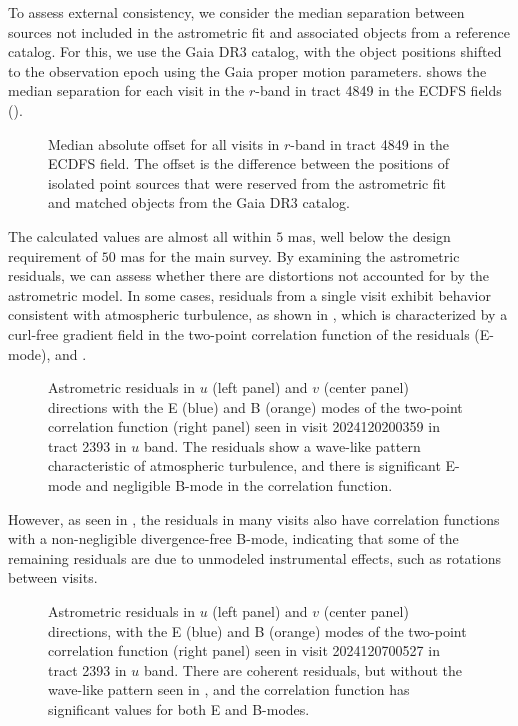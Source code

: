 To assess external consistency, we consider the median separation between sources not included in the astrometric fit and associated objects from a reference catalog.
For this, we use the Gaia \gls{DR3} catalog, with the object positions shifted to the observation epoch using the Gaia proper motion parameters.
 shows the median separation for each visit in the $r$-band in \gls{tract} 4849 in the ECDFS fields ().
\begin{figure}[htb!]
\caption{Median absolute offset for all visits in $r$-band in \gls{tract} 4849 in the ECDFS field. 
The offset is the difference between the positions of isolated point sources that were reserved from the astrometric fit and matched objects from the Gaia DR3 catalog.}
\label{fig:AA1}
\end{figure}
The calculated values are almost all within $5$\xspace mas, well below the design requirement of $50$\xspace mas for the main survey.
By examining the astrometric residuals, we can assess whether there are distortions not accounted for by the astrometric model. 
In some cases, residuals from a single visit exhibit behavior consistent with atmospheric turbulence, as shown in , which is characterized by a curl-free gradient field in the two-point correlation function of the residuals (E-mode),  \citet{Leget2021} and \citet{Fortino2021}. 
\begin{figure}[htb!]
\caption{Astrometric residuals in $u$ (left panel) and $v$ (center panel) directions with the E (blue) and B (orange) modes of the two-point correlation function (right panel) 
seen in visit 2024120200359 in tract 2393 in $u$ band.
The residuals show a wave-like pattern characteristic of atmospheric turbulence, and there is significant E-mode and negligible B-mode in the correlation function.}
\label{fig:Astrometry_Emode}
\end{figure}
However, as seen in , the residuals in many visits also have correlation functions with a non-negligible divergence-free B-mode,
indicating that some of the remaining residuals are due to unmodeled instrumental effects, such as rotations between visits.
\begin{figure}[htb!]
\caption{Astrometric residuals in $u$ (left panel) and $v$ (center panel) directions, with the E (blue)  and B (orange) 
modes of the two-point correlation function (right panel) seen in visit 2024120700527 in tract 2393 in $u$ band.
There are coherent residuals, but without the wave-like pattern seen in , and the correlation function has significant values for both E and B-modes.}
\label{fig:Astrometry_EBmode}
\end{figure}


